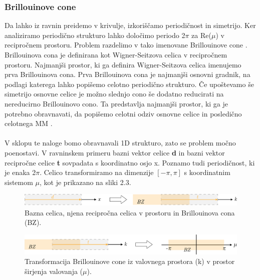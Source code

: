 \documentclass[12pt]{report}
\begin{document}
\subsubsection{Brillouinove cone}
Da lahko iz ravnin preidemo v krivulje, izkoriščamo periodičnost in simetrijo. Ker analiziramo periodično strukturo lahko določimo periodo 2$\pi$ za Re($\mu$) v recipročnem prostoru.
Problem razdelimo v tako imenovane Brillouinove cone \cite{vanbelle}.
\\Brillouinova cona je definirana kot Wigner-Seitzova celica v recipročnem prostoru. Najmanjši prostor, ki ga definira Wigner-Seitzova celica imenujemo prva Brillouinova cona.\cite{abhipod} Prva Brillouinova cona
je najmanjši osnovni gradnik, na podlagi katerega lahko popišemo celotno periodično strukturo. Če upoštevamo še simetrijo osnovne celice je možno slednjo cono še dodatno reducirati na nereducirno Brillouinovo cono. Ta predstavlja najmanjši prostor,
ki ga je potrebno obravnavati, da popišemo celotni odziv osnovne celice in posledično celotnega \ac{MM} \cite{kosir}.
\\
\\
V sklopu te naloge bomo obravnavali 1D strukturo, zato se problem močno poenostavi. V ravninskem primeru bazni vektor celice \textbf{d} in bazni vektor recipročne celice \textbf{t} sovpadata s koordinatno osjo x. Poznamo tudi periodičnost, ki je enaka 2$\pi$. 
Celico transformiramo na dimenzije $[-\pi, \pi]$ s koordinatnim sistemom $\mu$, kot je prikazano na sliki 2.3.

\begin{figure}[H]
  \centering
  \includegraphics[scale=0.8]{Images/osnovna_celica.png}
  \caption{Bazna celica, njena recipročna celica v prostoru in Brillouinova cona (BZ).}
\end{figure}
\begin{figure}[H]
  \centering
  \includegraphics[scale=0.8]{Images/transformacija.png}
  \caption{Transformacija Brillouinove cone iz valovnega prostora (k) v prostor širjenja valovanja ($\mu$).}
\end{figure}
\end{document}
